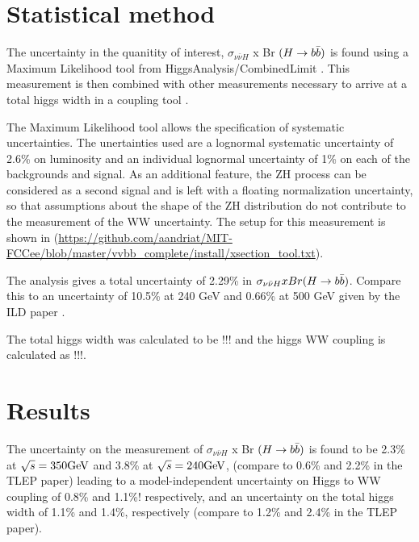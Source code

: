 \documentclass[preprintnumbers,nofootinbib,noshowpacs,eqsecnum,prd,superscriptaddress,letterpaper]{revtex4}
\begin{document}
\section{Statistical method}
\label{sec:method}

The uncertainty in the quanitity of interest, $\sigma_{\nu\bar{\nu}H}$ x Br $(H \rightarrow b\bar{b})$ is found using a Maximum Likelihood tool from HiggsAnalysis/CombinedLimit \cite{higgsanalysis}. This measurement is then combined with other measurements necessary to arrive at a total higgs width in a coupling tool \cite{couplingtool}.

The Maximum Likelihood tool allows the specification of systematic uncertainties. The unertainties used are a lognormal systematic uncertainty of 2.6\% on luminosity and an individual lognormal uncertainty of 1\% on each of the backgrounds and signal. As an additional feature, the ZH process can be considered as a second signal and is left with a floating normalization uncertainty, so that assumptions about the shape of the ZH distribution do not contribute to the measurement of the WW uncertainty. The setup for this measurement is shown in (\url{https://github.com/aandriat/MIT-FCCee/blob/master/vvbb_complete/install/xsection_tool.txt}).

The analysis gives a total uncertainty of 2.29\% in $\sigma_{\nu\bar{\nu}H} x Br(H \rightarrow b\bar{b})$. Compare this to an uncertainty of 10.5\% at 240 GeV and 0.66\% at 500 GeV given by the ILD paper \cite{ILD}.

The total higgs width was calculated to be !!! and the higgs WW coupling is calculated as !!!.

\section{Results}
\label{sec:results}

The uncertainty on the measurement of  $\sigma_{\nu\bar{\nu}H}$ x Br $(H \rightarrow b\bar{b})$ is found to be 2.3\% at $\sqrt{s} = 350 \text{GeV}$ and 3.8\% at $\sqrt{s} = 240 \text{GeV}$, (compare to 0.6\% and 2.2\% in the TLEP paper) leading to a model-independent uncertainty on Higgs to WW coupling of 0.8\% and 1.1\%! respectively, and an uncertainty on the total higgs width of 1.1\% and 1.4\%, respectively (compare to 1.2\% and 2.4\% in the TLEP paper).
\end{document}
